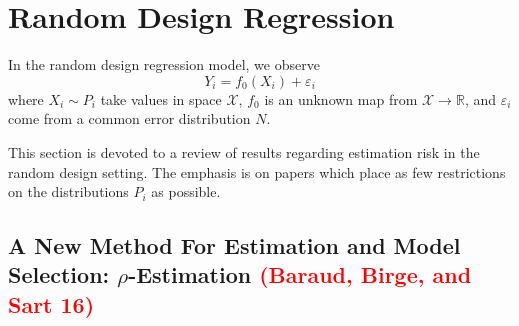 \documentclass{article}
\newcommand{\Reals}{\mathbb{R}}
\newcommand{\1}{\mathbf{1}}
\newcommand{\Xset}{\mathcal{X}}
\theoremstyle{alden}
\theoremstyle{aldenthm}
\theoremstyle{definition}
\theoremstyle{remark}
\begin{document}
\section{Random Design Regression}
In the random design regression model, we observe
\begin{equation*}
Y_i = f_0(X_i) + \varepsilon_i
\end{equation*}
where $X_i \sim P_i$ take values in space $\Xset$, $f_0$ is an unknown map from $\Xset \to \Reals$, and $\varepsilon_i$ come from a common error distribution $N$. 

This section is devoted to a review of results regarding estimation risk in the random design setting. The emphasis is on papers which place as few restrictions on the distributions $P_i$ as possible. 

\subsection{A New Method For Estimation and Model Selection: $\rho$-Estimation \textcolor{red}{(Baraud, Birge, and Sart 16)} }

\subsection{}
\clearpage
\end{document}
